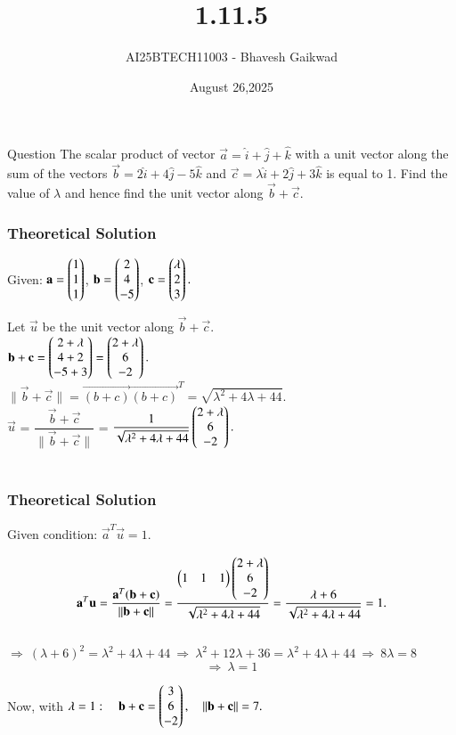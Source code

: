 \documentclass{beamer}
\title
{1.11.5}
\date{August 26,2025}
\author 
{AI25BTECH11003 - Bhavesh Gaikwad}
\begin{document}
\frame{\titlepage}
\begin{frame}{Question}
The scalar product of vector $\overrightarrow{a} = \hat{i} + \hat{j} + \hat{k}$ with a unit vector along the sum of the vectors $\overrightarrow{b} =2\hat{i} + 4\hat{j} - 5\hat{k} $ and $\overrightarrow{c} = \lambda\hat{i} + 2\hat{j} + 3\hat{k}$ is equal to 1. Find the value of $\lambda$ and hence find the unit vector along $\overrightarrow{b} + \overrightarrow{c}$.
\end{frame}


\begin{frame}[fragile]
    \frametitle{Theoretical Solution}

  Given: $\mathbf{a}=\begin{pmatrix}1\\1\\1\end{pmatrix}$,  $\mathbf{b}=\begin{pmatrix}2\\4\\-5\end{pmatrix}$,  $\mathbf{c}=\begin{pmatrix}\lambda\\2\\3\end{pmatrix}.$

Let $\vec{u}$ be the unit vector along $\vec{b} + \vec{c} .$ \\

$ \mathbf{b} + \mathbf{c} = \begin{pmatrix}2+\lambda\\4+2\\-5+3\end{pmatrix}
=\begin{pmatrix}2+\lambda\\6\\-2\end{pmatrix}.$ \\

$\|\vec{b}+\vec{c}\| = \vec{(b+c)}\vec{(b+c)}^T
 = \sqrt{\lambda^2+4\lambda+44}.$ \\

$\vec{u}$ = $\dfrac{\vec{b} + \vec{c}}{\|\vec{b}+\vec{c}\|}$ = $\dfrac{1}{\sqrt{\lambda^2+4\lambda+44}} \begin{pmatrix}2+\lambda\\6\\-2\end{pmatrix}.$ \\\\

\end{frame}


\begin{frame}[fragile]
    \frametitle{Theoretical Solution}

Given condition: $\vec{a}^T\vec{u}=1.$  

$$ \mathbf{a}^T\mathbf{u} = \dfrac{\mathbf{a}^T(\mathbf{b}+\mathbf{c})}{\|\mathbf{b}+\mathbf{c}\|}
= \dfrac{\begin{pmatrix}1 & 1 & 1\end{pmatrix}\begin{pmatrix}2+\lambda\\6\\-2\end{pmatrix}}
{\sqrt{\lambda^2+4\lambda+44}}
= \dfrac{\lambda+6}{\sqrt{\lambda^2+4\lambda+44}}=1.
$$ \\


$
\Rightarrow\ (\lambda+6)^2=\lambda^2+4\lambda+44
\ \Longrightarrow\ 
\lambda^2+12\lambda+36=\lambda^2+4\lambda+44
\ \Longrightarrow\ 
8\lambda=8\ $
$$\Longrightarrow\ 
\boxed{\lambda=1}$$

Now, with $\lambda=1:\quad \mathbf{b}+\mathbf{c}
=\begin{pmatrix}3\\6\\-2\end{pmatrix},\quad \|\mathbf{b}+\mathbf{c}\| = 7.$ \\
   
\end{frame}
\end{document}
